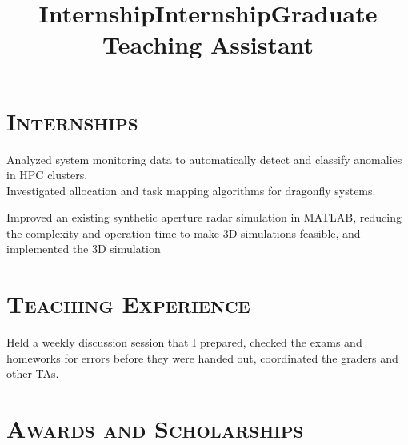 \begin{resume}
	\section{\textsc{Internships}}
	
	\title{Internship}
	\begin{position}
		Analyzed system monitoring data to automatically detect and classify
    anomalies in HPC clusters. \\
    Investigated allocation and task mapping algorithms for dragonfly systems.
	\end{position}
	
	\title{Internship}
	\begin{position}
		Improved an existing synthetic aperture radar simulation in MATLAB, reducing
    the complexity and operation time to make 3D simulations feasible, and
    implemented the 3D simulation 
	\end{position}
	
	
	\section{\textsc{Teaching Experience}}
	
	\title{Graduate Teaching Assistant}
	\begin{position}
		Held a weekly discussion session that I prepared, checked the exams and
    homeworks for errors before they were handed out, coordinated the graders
    and other TAs. 
	\end{position}
	
	
	\section{\textsc{Awards and Scholarships}}
	

\end{resume}
